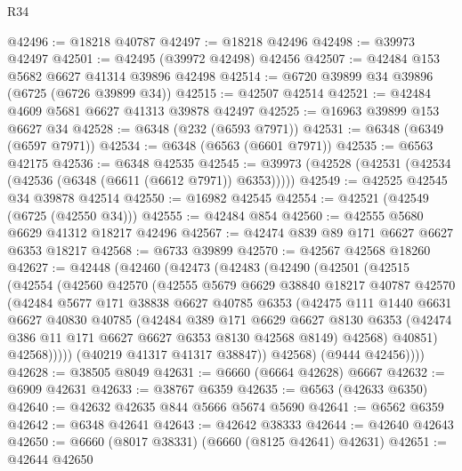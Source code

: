 \begin{lexlean}{R34}
\begin{coremodule}
@42496 := @18218 @40787
@42497 := @18218 @42496
@42498 := @39973 @42497
@42501 := @42495 (@39972 @42498) @42456
@42507 := @42484 @153 @5682 @6627 @41314 @39896 @42498
@42514 := @6720 @39899 @34 @39896 (@6725 (@6726 @39899 @34))
@42515 := @42507 @42514
@42521 := @42484 @4609 @5681 @6627 @41313 @39878 @42497
@42525 := @16963 @39899 @153 @6627 @34
@42528 := @6348 (@232 (@6593 @7971))
@42531 := @6348 (@6349 (@6597 @7971))
@42534 := @6348 (@6563 (@6601 @7971))
@42535 := @6563 @42175
@42536 := @6348 @42535
@42545 := @39973 (@42528 (@42531 (@42534 (@42536 (@6348 (@6611 (@6612 @7971)) @6353)))))
@42549 := @42525 @42545 @34 @39878 @42514
@42550 := @16982 @42545
@42554 := @42521 (@42549 (@6725 (@42550 @34)))
@42555 := @42484 @854
@42560 := @42555 @5680 @6629 @41312 @18217 @42496
@42567 := @42474 @839 @89 @171 @6627 @6627 @6353 @18217
@42568 := @6733 @39899
@42570 := @42567 @42568 @18260
@42627 := @42448
    (@42460
      (@42473
        (@42483
          (@42490
            (@42501
              (@42515
                (@42554
                  (@42560
                    @42570
                    (@42555
                      @5679
                      @6629
                      @38840
                      @18217
                      @40787
                      @42570
                      (@42484
                        @5677
                        @171
                        @38838
                        @6627
                        @40785
                        @6353
                        (@42475
                          @111
                          @1440
                          @6631
                          @6627
                          @40830
                          @40785
                          (@42484
                            @389
                            @171
                            @6629
                            @6627
                            @8130
                            @6353
                            (@42474 @386 @11 @171 @6627 @6627 @6353 @8130 @42568 @8149)
                            @42568)
                          @40851)
                        @42568)))))
              (@40219 @41317 @41317 @38847))
            @42568)
          (@9444 @42456))))
@42628 := @38505 @8049
@42631 := @6660 (@6664 @42628) @6667
@42632 := @6909 @42631
@42633 := @38767 @6359
@42635 := @6563 (@42633 @6350)
@42640 := @42632 @42635 @844 @5666 @5674 @5690
@42641 := @6562 @6359
@42642 := @6348 @42641
@42643 := @42642 @38333
@42644 := @42640 @42643
@42650 := @6660 (@8017 @38331) (@6660 (@8125 @42641) @42631)
@42651 := @42644 @42650

\end{coremodule}
\end{lexlean}
